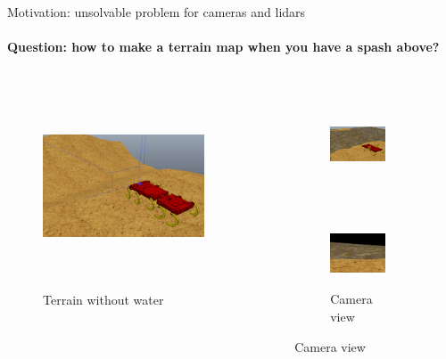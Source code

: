 \documentclass[aspectratio=169]{beamer}
\begin{document}
\begin{frame}[t]{Motivation: unsolvable problem for cameras and lidars}
    \framesubtitle{Question: how to make a terrain map when you have a spash above?}
    \vspace{-1cm}
    \begin{columns}[T,onlytextwidth]
        \begin{column}{0.55\textwidth}
            \begin{figure}[H]
                \centering\includegraphics[height=6cm,width=1\textwidth,keepaspectratio]{terrain_wo_water.png}
                \caption*{Terrain without water}
            \end{figure}
        \end{column}
        \begin{column}{0.44\textwidth}
            \begin{figure}[H]
                \begin{subfigure}[b]{0.8\textwidth}
                    \centering\includegraphics[height=3.5cm,width=1\textwidth,keepaspectratio]{terrain_w_water1.png}
                \end{subfigure}

                \begin{subfigure}{0.8\textwidth}
                    \centering\includegraphics[height=2cm,width=1\textwidth,keepaspectratio]{terrain_w_water_camera.png}
                    \caption*{Camera view}
                \end{subfigure}
            \end{figure}
        \end{column}
    \end{columns}

\end{frame}
\end{document}
